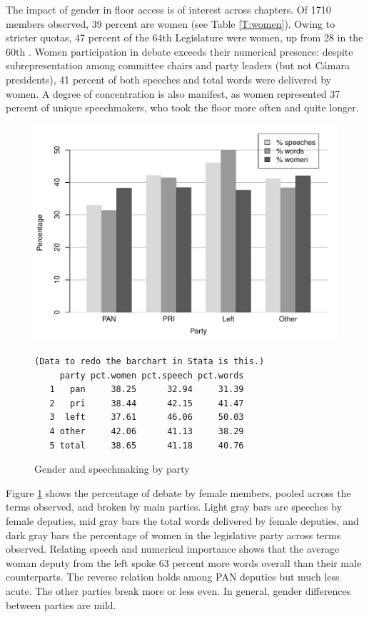 \documentclass[letter,12pt]{article}
\begin{document}
The impact of gender in floor access is of interest across chapters. Of 1710 members observed, 39 percent are women (see Table \ref{T:women}). Owing to stricter quotas, 47 percent of the 64th Legislature were women, up from 28 in the 60th \citep{piscopo.2016}. Women participation in debate exceeds their numerical presence: despite subrepresentation among committee chairs and party leaders (but not Cámara presidents), 41 percent of both speeches and total words were delivered by women. A degree of concentration is also manifest, as women represented 37 percent of unique speechmakers, who took the floor more often and quite longer. 

\begin{figure}
  \centering
    \includegraphics[width=.67\columnwidth]{../plots/women-bar.pdf}
\singlespacing
\begin{scriptsize}
\begin{verbatim}
(Data to redo the barchart in Stata is this.)
     party pct.women pct.speech pct.words
   1   pan     38.25      32.94     31.39
   2   pri     38.44      42.15     41.47
   3  left     37.61      46.06     50.03
   4 other     42.06      41.13     38.29
   5 total     38.65      41.18     40.76
\end{verbatim}
\end{scriptsize}
\doublespacing
    \caption{Gender and speechmaking by party}\label{F:women}
\end{figure}

Figure \ref{F:women} shows the percentage of debate by female members, pooled across the terms observed, and broken by main parties. Light gray bars are speeches by female deputies, mid gray bars the total words delivered by female deputies, and dark gray bars the percentage of women in the legislative party across terms observed. Relating speech and numerical importance shows that the average woman deputy from the left spoke 63 percent more words overall than their male counterparts. The reverse relation holds among PAN deputies but much less acute. The other parties break more or less even. In general, gender differences between parties are mild. 
\end{document}
